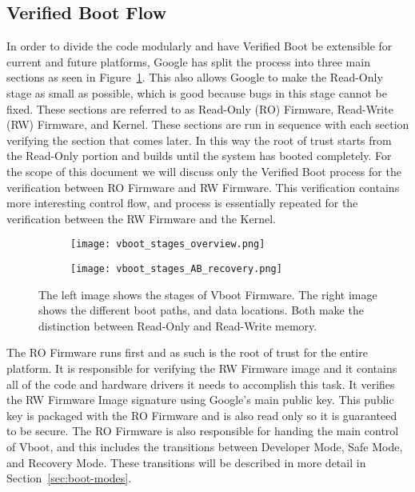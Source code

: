 \documentclass[../report.tex]{subfiles}
\begin{document}
\subsection{Verified Boot Flow}

In order to divide the code modularly and have Verified Boot be extensible for current and future platforms, Google has split the process into three main sections as seen in Figure~\ref{fig:vboot_stages_overview}.
This also allows Google to make the Read-Only stage as small as possible, which is good because bugs in this stage cannot be fixed.
These sections are referred to as Read-Only (RO) Firmware, Read-Write
(RW) Firmware, and Kernel.
These sections are run in sequence with each section verifying the section that comes later.
In this way the root of trust starts from the Read-Only portion and builds until the system has booted completely.
For the scope of this document we will discuss only the Verified Boot process for the verification between RO Firmware and RW Firmware. 
This verification contains more interesting control flow, and process is essentially repeated for the verification between the RW Firmware and the Kernel.

\begin{figure}
\begin{subfigure}{.4\textwidth}
  \centering
  \texttt{[image: vboot\_stages\_overview.png]}
\end{subfigure}
\begin{subfigure}{.60\textwidth}
  \centering
  \texttt{[image: vboot\_stages\_AB\_recovery.png]}
\end{subfigure}
\caption{The left image shows the stages of Vboot Firmware. The right image
shows the different boot paths, and data locations. Both make the distinction
between Read-Only and Read-Write memory.}
\label{fig:vboot_stages_overview}
\end{figure}

The RO Firmware runs first and as such is the root of trust for the entire platform.
It is responsible for verifying the RW Firmware image and it contains all of the code and hardware drivers it needs to accomplish this task.
It verifies the RW Firmware Image signature using Google's main public key.
This public key is packaged with the RO Firmware and is also read only so it is guaranteed to be secure.
The RO Firmware is also responsible for handing the main control of Vboot, and this includes the transitions between Developer Mode, Safe Mode, and Recovery Mode.
These transitions will be described in more detail in Section~\ref{sec:boot-modes}.
\end{document}
